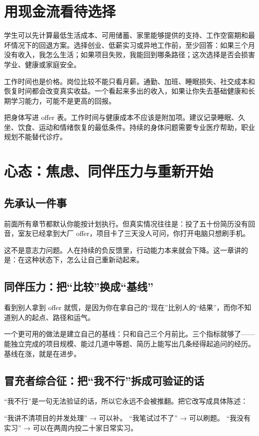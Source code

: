 \documentclass[UTF8,zihao=5,openany]{ctexbook}
\begin{document}
\section{用现金流看待选择}
学生可以先计算最低生活成本、可用储蓄、家里能够提供的支持、工作空窗期和最坏情况下的回退方案。选择创业、低薪实习或异地工作前，至少回答：如果三个月没有收入，我怎么生活；如果项目失败，我能回到哪条路径；这次选择是否会损害学业、健康或家庭安全。

工作时间也是价格。岗位比较不能只看月薪。通勤、加班、睡眠损失、社交成本和恢复时间都会改变真实收益。一个看起来多出的收入，如果让你失去基础健康和长期学习能力，可能不是更高的回报。

把身体写进 offer 表。工作时间与健康成本不应该是附加项。建议记录睡眠、久坐、饮食、运动和情绪恢复的最低条件。持续的身体问题需要专业医疗帮助，职业规划不能替代诊疗。

\section{心态：焦虑、同伴压力与重新开始}
\subsection{先承认一件事}
前面所有章节都默认你能按计划执行。但真实情况往往是：投了五十份简历没有回音，室友已经拿到大厂 offer，项目卡了三天没人可问，你打开电脑只想刷手机。

这不是意志力问题。人在持续的负反馈里，行动能力本来就会下降。这一章讲的是：在这种状态下，怎么让自己重新动起来。

\subsection{同伴压力：把“比较”换成“基线”}
看到别人拿到 offer 就慌，是因为你在拿自己的“现在”比别人的“结果”，而你不知道别人的起点、路径和运气。

一个更可用的做法是建立自己的基线：只和自己三个月前比。三个指标就够了——能独立完成的项目规模、能过几道中等题、简历上能写出几条经得起追问的经历。基线在涨，就是在进步。

\subsection{冒充者综合征：把“我不行”拆成可验证的话}
“我不行”是一句无法验证的话，所以它永远不会被推翻。把它改写成具体陈述：

“我讲不清项目的并发处理” → 可以补。
“我笔试过不了” → 可以刷题。
“我没有实习” → 可以在两周内投二十家日常实习。
\end{document}
